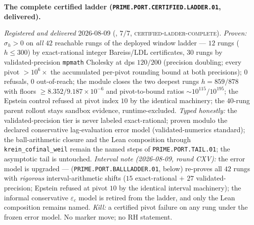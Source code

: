 \documentclass[11pt,a4paper]{article}
\begin{document}
\par\smallskip\noindent\textbf{The complete certified ladder
(\texttt{PRIME.PORT.CERTIFIED.\allowbreak LADDER.01},
delivered).}
{\sloppy
\emph{Registered and delivered} 2026-08-09
(, $7/7$,
\textsc{certified-ladder-complete}).  \emph{Proven:} $\sigma_h >
0$ on \emph{all} $42$ reachable rungs of the deployed window
ladder --- $12$ rungs ($h \le 300$) by exact-rational integer
Bareiss/LDL certificates, $30$ rungs by validated-precision
\texttt{mpmath} Cholesky at dps $120/200$ (precision doubling;
every pivot $> 10^{6}\times$ the accumulated per-pivot rounding
bound at both precisions); $0$ refusals, $0$ out-of-reach; the
module closes the two deepest rungs $h = 859/878$ with floors
$\ge 8.352/9.187\times10^{-6}$ and pivot-to-bound ratios
${\sim}10^{115}/10^{195}$; the Epstein control refused at pivot
index $10$ by the identical machinery; the $40$-rung parent
rollout stays sandbox evidence, runtime-excluded.  \emph{Typed
honestly:} the validated-precision tier is never labeled
exact-rational; proven modulo the declared conservative
lag-evaluation error model (validated-numerics standard); the
ball-arithmetic closure and the Lean composition through
\texttt{krein\_cofinal\_weil} remain the named steps of
\texttt{PRIME.PORT.TAIL.01}; the asymptotic tail is untouched.
\emph{Interval note (2026-08-09, round CXV):} the error model is
upgraded --- 
(\texttt{PRIME.PORT.BALLLADDER.01}, below) re-proves all $42$
rungs with \emph{rigorous} interval-arithmetic shifts ($15$
exact-rational $+$ $27$ validated-precision; Epstein refused at
pivot $10$ by the identical interval machinery); the informal
conservative $\varepsilon_c$ model is retired from the ladder,
and only the Lean composition remains named.
\emph{Kill:} a certified pivot failure on any rung under the
frozen error model.  No marker move; no RH statement.\par}
\end{document}
